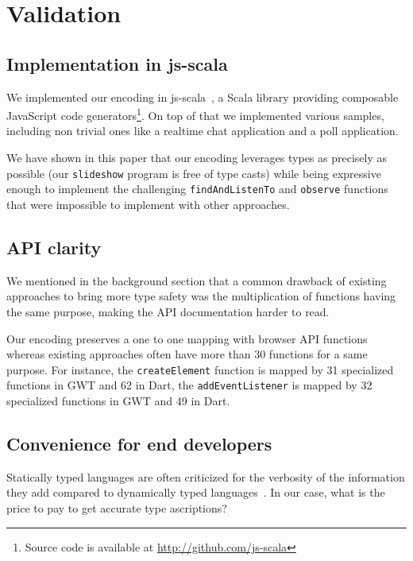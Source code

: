\documentclass{llncs}
\newcommand{\jscode}[1]{\lstinline[language=JavaScript]|#1|}
\newcommand{\scalacode}[1]{\lstinline[language=Scala]|#1|}
\begin{document}
\section{Validation}
\label{sec-validation}

\subsection{Implementation in js-scala}

We implemented our encoding in js-scala~\cite{Kossakowski12_JsDESL}, a Scala library providing composable JavaScript code generators\footnote{Source code is available at \href{http://github.com/js-scala}{http://github.com/js-scala}}. On top of that we implemented various samples, including non trivial ones like a realtime chat application and a poll application.

We have shown in this paper that our encoding leverages types as precisely as possible (our \scalacode{slideshow} program is free of type casts) while being expressive enough to implement the challenging \jscode{findAndListenTo} and \jscode{observe} functions that were impossible to implement with other approaches.

\subsection{API clarity}

We mentioned in the background section that a common drawback of existing approaches to bring more type safety was the multiplication of functions having the same purpose, making the API documentation harder to read.

Our encoding preserves a one to one mapping with browser API functions whereas existing approaches often have more than 30 functions for a same purpose. For instance, the \jscode{createElement} function is mapped by 31 specialized functions in GWT and 62 in Dart, the \jscode{addEventListener} is mapped by 32 specialized functions in GWT and 49 in Dart.

\subsection{Convenience for end developers}

Statically typed languages are often criticized for the verbosity of the information they add compared to dynamically typed languages~\cite{meijer2004static}. In our case, what is the price to pay to get accurate type ascriptions?
\end{document}
